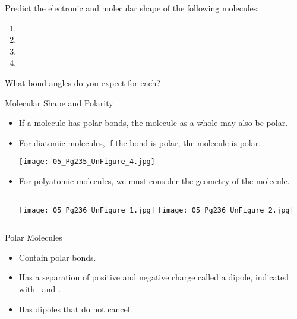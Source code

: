 \documentclass[notes=onlyslideswithnotes,notes=hide]{beamer}
\begin{document}
\begin{onyourown}
	Predict the electronic and molecular shape of the following molecules:

	\begin{enumerate}
		\item {}
		\item {}
		\item {}
		\item {}
	\end{enumerate}

	What bond angles do you expect for each?
\end{onyourown}

\begin{frame}{Molecular Shape and Polarity}
	\begin{itemize}
		\item If a molecule has polar bonds, the molecule as a whole may
			also be polar. \pause
		\item For diatomic molecules, if the bond is polar, the molecule
			is polar.

			\begin{center}
				\texttt{[image: 05\_Pg235\_UnFigure\_4.jpg]}
			\end{center}

			\pause

		\item For polyatomic molecules, we must consider the
			\alert{geometry} of the molecule.

			\begin{columns}
				\centering
				\texttt{[image: 05\_Pg236\_UnFigure\_1.jpg]}
				\centering
				\texttt{[image: 05\_Pg236\_UnFigure\_2.jpg]}
			\end{columns}
	\end{itemize}
\end{frame}

\begin{frame}{Polar Molecules}
	\begin{itemize}
		\item Contain \alert{polar} bonds.
		\item Has a separation of positive and negative charge called a
			dipole, indicated with \delp\ and \delm.
		\item Has dipoles that \alert{do not} cancel.
	\end{itemize}

	\bigskip

	\begin{center}
		\hspace{5em}
	\end{center}
\end{frame}
\end{document}
